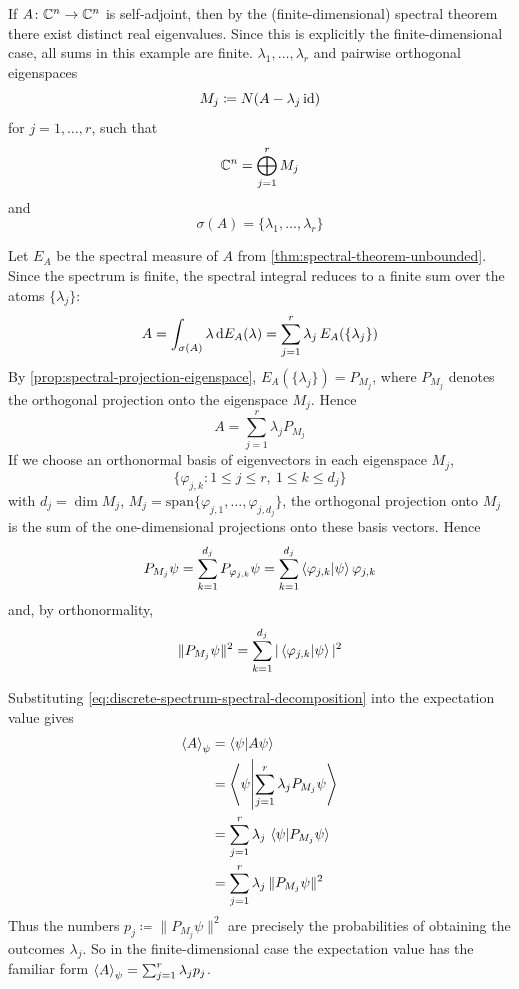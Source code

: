 \begin{example}\label{ex:finite-dimensional-case}
If ${A} \colon \mathbb{C}^n \to \mathbb{C}^n$ is self-adjoint, then by the (finite-dimensional) spectral theorem there exist distinct real eigenvalues.
Since this is explicitly the finite-dimensional case, all sums in this example are finite.
\(
\lambda_1,\dots,\lambda_r
\)
and pairwise orthogonal eigenspaces
\[
M_j \coloneq N({A}-\lambda_j \operatorname{id})
\]
for
\(
j=1,\dots,r
\),
such that
\[
\mathbb{C}^n = \bigoplus_{j=1}^r M_j
\]
and
\[
\sigma(A)=\{\lambda_1,\dots,\lambda_r\}
\]

Let $E_A$ be the spectral measure of $A$ from \autoref{thm:spectral-theorem-unbounded}. Since the spectrum is finite, the spectral integral
reduces to a finite sum over the atoms $\{\lambda_j\}$:
\begin{equation}\label{eq:discrete-spectrum-spectral-integral}
A
=
\int_{\sigma(A)} \lambda \,\mathrm{d} E_A(\lambda)
=
\sum_{j=1}^r \lambda_j\, E_A(\{\lambda_j\})
\end{equation}
By \autoref{prop:spectral-projection-eigenspace},
\(
E_A(\{\lambda_j\}) = P_{M_j}
\),
where $P_{M_j}$ denotes the orthogonal projection onto the eigenspace $M_j$.
Hence
\begin{equation}\label{eq:discrete-spectrum-spectral-decomposition}
{A} = \sum_{j=1}^r \lambda_j P_{M_j}
\end{equation}
If we choose an orthonormal basis of eigenvectors in each eigenspace \(M_j\),
\[
\{\varphi_{j,k}: 1\le j\le r,\ 1\le k\le d_j\}
\]
with
\(
d_j = \dim M_j
\),
\(
M_j = \mathrm{span}\{\varphi_{j,1},\dots,\varphi_{j,d_j}\}
\),
 the orthogonal projection onto \(M_j\) is the sum of the one-dimensional projections onto these basis vectors. Hence
\[
P_{M_j}\psi 
= %
\sum_{k=1}^{d_j} P_{\varphi_{j,k}}\psi
= %
\sum_{k=1}^{d_j} \braket{\varphi_{j,k}|\psi} \varphi_{j,k}
\]
and, by orthonormality,
\begin{equation}\label{eq:projection-onto-eigenspace-squared-norm}
\|P_{M_j}\psi\|^2
=
\sum_{k=1}^{d_j} |\braket{\varphi_{j,k}|\psi}|^2
\end{equation}


Substituting \eqref{eq:discrete-spectrum-spectral-decomposition} into the expectation value gives
\[
\begin{aligned}
\braket{{A}}_{\psi}
&=
\braket{\psi|{A}\psi}
\\
&=
\left\langle \psi \middle| \sum_{j=1}^r \lambda_j P_{M_j}\psi \right\rangle
\\
&=
\sum_{j=1}^r \lambda_j \, \braket{\psi|P_{M_j}\psi}
\\
&=
\sum_{j=1}^r \lambda_j \, \|P_{M_j}\psi\|^2
\end{aligned}
\]
Thus the numbers
\(
p_j \coloneq \|P_{M_j}\psi\|^2
\)
are precisely the probabilities of obtaining the outcomes $\lambda_j$.
So in the finite-dimensional case the expectation value has the familiar form
\(
\braket{{A}}_{\psi} = \sum_{j = 1}^r \lambda_j p_j
\).



\end{example}
